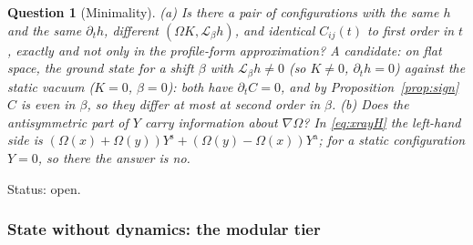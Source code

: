 \documentclass[11pt,a4paper]{article}
\theoremstyle{stmt}
\theoremstyle{defn}
\theoremstyle{rmk}
\newtheorem{question}[theorem]{Question}
\numberwithin{equation}{section}
\newcommand{\Lie}{\mathcal{L}}
\newcommand{\status}[1]{\par\noindent\textsf{\small Status: #1}\par}
\begin{document}
{\begin{question}[Minimality]\label{q:minimal}
\textup{(a)} Is there a pair of configurations with the same $h$ and the same $\partial_th$, different $(\Omega K,\Lie_\beta h)$, and \emph{identical} $C_{ij}(t)$ to first order in $t$, exactly and not only in the profile-form approximation? A candidate: on flat space, the ground state for a shift $\beta$ with $\Lie_\beta h\ne0$ (so $K\ne0$, $\partial_th=0$) against the static vacuum ($K=0$, $\beta=0$): both have $\partial_tC=0$, and by Proposition~\ref{prop:sign} $C$ is even in $\beta$, so they differ at most at second order in $\beta$.
\textup{(b)} Does the antisymmetric part of $Y$ carry information about $\nabla\Omega$? In \eqref{eq:xrayH} the left-hand side is $(\Omega(x)+\Omega(y))Y^{\mathrm s}+(\Omega(y)-\Omega(x))Y^{\mathrm a}$; for a static configuration $Y=0$, so there the answer is no.
\end{question}
\status{open.}

\subsubsection{State without dynamics: the modular tier}

}
\end{document}
